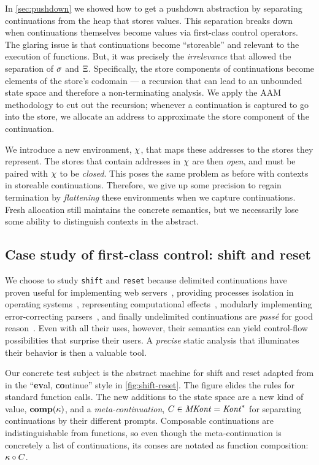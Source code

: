 In \autoref{sec:pushdown} we showed how to get a pushdown abstraction by separating continuations from the heap that stores values.
%
This separation breaks down when continuations themselves become values via first-class control operators.
%
The glaring issue is that continuations become ``storeable'' and relevant to the execution of functions.
%
But, it was precisely the \emph{irrelevance} that allowed the separation of $\sigma$ and $\Xi$.
%
Specifically, the store components of continuations become elements of the store's codomain --- a recursion that can lead to an unbounded state space and therefore a non-terminating analysis.
%
We apply the AAM methodology to cut out the recursion; whenever a continuation is captured to go into the store, we allocate an address to approximate the store component of the continuation.

We introduce a new environment, $\chi$, that maps these addresses to the stores they represent.
%
The stores that contain addresses in $\chi$ are then \emph{open}, and must be paired with $\chi$ to be \emph{closed}.
%
This poses the same problem as before with contexts in storeable continuations.
%
Therefore, we give up some precision to regain termination by \emph{flattening} these environments when we capture continuations.
%
Fresh allocation still maintains the concrete semantics, but we necessarily lose some ability to distinguish contexts in the abstract.

\subsection{Case study of first-class control: shift and reset}
We choose to study {\tt shift} and {\tt reset} because delimited continuations have proven useful for implementing web servers~\citep{dvanhorn:Queinnec2004Continuations,jay-communication}, providing processes isolation in operating systems~\citep{ianjohnson:Kiselyov2007Delimited}, representing computational effects~\citep{ianjohnson:Filinski1994Representing}, modularly implementing error-correcting parsers~\citep{ianjohnson:DBLP:conf/icfp/ShiversT11}, and finally undelimited continuations are \emph{pass\'e} for good reason~\citep{ianjohnson:kiselyov:against-callcc}.
%
Even with all their uses, however, their semantics can yield control-flow possibilities that surprise their users.
%
A \emph{precise} static analysis that illuminates their behavior is then a valuable tool.
%

Our concrete test subject is the abstract machine for shift and reset adapted from \citet{ianjohnson:Biernacki2006274} in the ``{\bf ev}al, {\bf co}ntinue'' style in \autoref{fig:shift-reset}.
%
The figure elides the rules for standard function calls.
%
The new additions to the state space are a new kind of value, $\mathbf{comp}(\kappa)$, and a \emph{meta-continuation}, $C \in \mathit{MKont} = \mathit{Kont}^*$ for separating continuations by their different prompts.
%
Composable continuations are indistinguishable from functions, so even though the meta-continuation is concretely a list of continuations, its conses are notated as function composition: $\kappa\circ C$.

